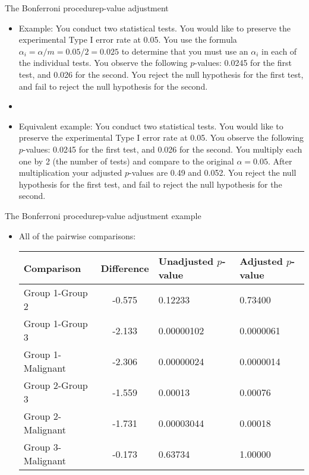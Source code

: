 \documentclass[xcolor=dvipsnames]{beamer}
\begin{document}
\begin{frame}{The Bonferroni procedure}{p-value adjustment }
	\begin{itemize}
		\item Example: You conduct two statistical tests. You would like to preserve the experimental Type I error rate at 0.05. You use the formula $\alpha_i = \alpha / m = 0.05 / 2 = 0.025$ to determine that you must use an $\alpha_i$ in each of the individual tests. You observe the following $p$-values: 0.0245 for the first test, and 0.026 for the second. You reject the null hypothesis for the first test, and fail to reject the null hypothesis for the second. 
		\item[]
		\item Equivalent example:  You conduct two statistical tests. You would like to preserve the experimental Type I error rate at 0.05.  You observe the following $p$-values: 0.0245 for the first test, and 0.026 for the second. You multiply each one by 2 (the number of tests) and compare to the original $\alpha = 0.05$. After multiplication your adjusted $p$-values are 0.49 and 0.052.  You reject the null hypothesis for the first test, and fail to reject the null hypothesis for the second.
	\end{itemize}
\end{frame}

\begin{frame}{The Bonferroni procedure}{p-value adjustment example}
	\begin{itemize}
		\item All of the pairwise comparisons:
		\vspace{4mm}
		\begin{center}
			\begin{tabular}{|l|c|p{2cm}|p{2cm}|}
				\hline
				\textbf{Comparison} & \textbf{Difference} & Unadjusted $p$-value & Adjusted $p$-value \\   \hline \hline    
				Group 1-Group 2  &  -0.575 &    0.12233 &  0.73400  \\ \hline
				Group 1-Group 3 &   -2.133  & 0.00000102 & 0.0000061 \\ \hline
				Group 1-Malignant & -2.306 & 0.00000024 & 0.0000014 \\ \hline
				Group 2-Group 3  &  -1.559 &    0.00013 & 0.00076 \\ \hline
				Group 2-Malignant  & -1.731 & 0.00003044 & 0.00018\\ \hline
				Group 3-Malignant & -0.173 &   0.63734 & 1.00000 \\ \hline
			\end{tabular}
		\end{center}
	\end{itemize}
\end{frame}
\end{document}

